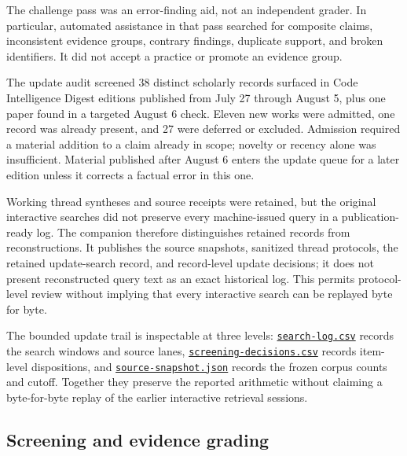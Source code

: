The challenge pass was an error-finding aid, not an independent grader. In particular, automated assistance in that pass searched for composite claims, inconsistent evidence groups, contrary findings, duplicate support, and broken identifiers. It did not accept a practice or promote an evidence group.

The update audit screened 38 distinct scholarly records surfaced in Code Intelligence Digest editions published from July 27 through August 5, plus one paper found in a targeted August 6 check. Eleven new works were admitted, one record was already present, and 27 were deferred or excluded. Admission required a material addition to a claim already in scope; novelty or recency alone was insufficient. Material published after August 6 enters the update queue for a later edition unless it corrects a factual error in this one.

Working thread syntheses and source receipts were retained, but the original interactive searches did not preserve every machine-issued query in a publication-ready log. The companion therefore distinguishes retained records from reconstructions. It publishes the source snapshots, sanitized thread protocols, the retained update-search record, and record-level update decisions; it does not present reconstructed query text as an exact historical log. This permits protocol-level review without implying that every interactive search can be replayed byte for byte.

The bounded update trail is inspectable at three levels: \href{https://github.com/sjarmak/engineering-reliable-coding-agents/blob/main/companion/methodology/search-log.csv}{\texttt{search-log.csv}} records the search windows and source lanes, \href{https://github.com/sjarmak/engineering-reliable-coding-agents/blob/main/companion/methodology/screening-decisions.csv}{\texttt{screening-decisions.csv}} records item-level dispositions, and \href{https://github.com/sjarmak/engineering-reliable-coding-agents/blob/main/companion/methodology/source-snapshot.json}{\texttt{source-snapshot.json}} records the frozen corpus counts and cutoff. Together they preserve the reported arithmetic without claiming a byte-for-byte replay of the earlier interactive retrieval sessions.

\hypertarget{screening-and-evidence-grading}{%
\subsection{Screening and evidence grading}\label{screening-and-evidence-grading}}


